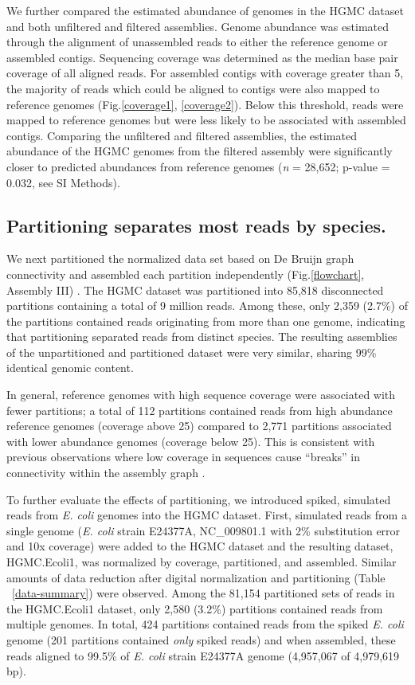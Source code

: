\documentclass{pnastwo}
\begin{document}
\begin{article}
We further compared the estimated abundance of genomes in the HGMC dataset and
both unfiltered and filtered assemblies. Genome abundance was estimated through
the alignment of unassembled reads to either the reference genome or assembled
contigs. Sequencing coverage was determined as the median base pair coverage of
all aligned reads. For assembled contigs with coverage greater than 5, the
majority of reads which could be aligned to contigs were also mapped to reference
genomes (Fig.\ref{coverage1}, \ref{coverage2}). Below this threshold, reads were mapped to reference
genomes but were less likely to be associated with assembled contigs. Comparing
the unfiltered and filtered assemblies, the estimated abundance of the HGMC
genomes from the filtered assembly were significantly closer to predicted
abundances from reference genomes (\emph{n} = 28,652; p-value = 0.032, see SI
Methods).

\subsection*{Partitioning separates most reads by species.} We next partitioned
the normalized data set based on De Bruijn graph connectivity and assembled each
partition independently (Fig.\ref{flowchart}, Assembly III) . The HGMC dataset
was partitioned into 85,818 disconnected partitions containing a total of 9
million reads. Among these, only 2,359 (2.7\%) of the partitions contained reads
originating from more than one genome, indicating that partitioning separated
reads from distinct species. The resulting assemblies of the unpartitioned and
partitioned dataset were very similar, sharing 99\% identical genomic content.

In general, reference genomes with high sequence coverage were associated with
fewer partitions; a total of 112 partitions contained reads from
high abundance reference genomes (coverage above 25) compared to 2,771
partitions associated with lower abundance genomes (coverage below 25). This is
consistent with previous observations where low coverage in sequences cause
``breaks'' in connectivity within the assembly graph
\cite{Chaisson:2008p1373,Pevzner:2001p1374}.

To further evaluate the effects of partitioning, we introduced spiked, simulated
reads from \emph{E. coli} genomes into the HGMC dataset. First, simulated reads
from a single genome (\emph{E. coli} strain E24377A, NC\_009801.1 with 2\%
substitution error and 10x coverage) were added to the HGMC dataset and the
resulting dataset, HGMC.Ecoli1, was normalized by coverage, partitioned, and
assembled. Similar amounts of data reduction after digital normalization and
partitioning (Table ~\ref{data-summary}) were observed. Among the 81,154
partitioned sets of reads in the HGMC.Ecoli1 dataset, only 2,580 (3.2\%)
partitions contained reads from multiple genomes. In total, 424 partitions
contained reads from the spiked \emph{E. coli} genome (201 partitions contained
\emph{only} spiked reads) and when assembled, these reads aligned to 99.5\% of
\emph{E. coli} strain E24377A genome (4,957,067 of 4,979,619 bp).


\end{article}
\end{document}
